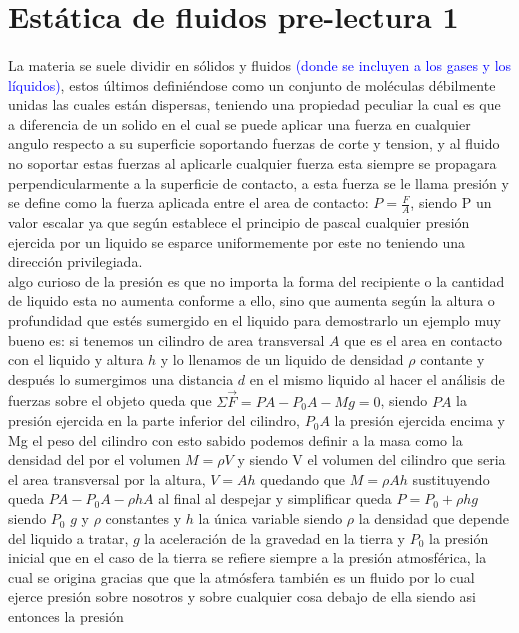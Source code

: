 \documentclass{article}
\begin{document}
\section*{Estática de fluidos pre-lectura 1}
\paragraph*{}
La materia se suele dividir en sólidos y fluidos \textcolor{blue}{(donde se incluyen a los gases y los líquidos)},
estos últimos definiéndose como un conjunto de moléculas débilmente unidas las cuales están dispersas, teniendo una propiedad peculiar la cual es que a diferencia
de un solido en el cual se puede aplicar una fuerza en cualquier angulo respecto a su superficie soportando fuerzas de corte y tension, y al fluido no soportar estas fuerzas 
al aplicarle cualquier fuerza esta siempre se propagara perpendicularmente a la superficie de contacto, a esta fuerza
se le llama presión y se define como la fuerza aplicada entre el area de contacto: $P =\frac{F}{A}$, siendo P un valor
escalar ya que según establece el principio de pascal cualquier presión ejercida por un liquido se esparce uniformemente por este no teniendo una dirección privilegiada.\\
algo curioso de la presión es que no importa la forma del recipiente o la cantidad de liquido esta no aumenta conforme a ello,
sino que aumenta según la altura o profundidad que estés sumergido en el liquido
para demostrarlo  un ejemplo muy bueno es:
si tenemos un cilindro de area transversal $A$ que es el area en contacto con el liquido y altura $h$ y lo llenamos de un liquido de densidad $\rho$ contante
y después lo sumergimos una distancia $d$ en el mismo liquido al hacer el análisis de fuerzas sobre el objeto queda que
$\Sigma \vec{F}=PA-{P}_{0}A-Mg=0$, siendo $PA$ la presión ejercida en la parte inferior del cilindro, ${P}_{0}A$ la presión ejercida encima y Mg el peso del cilindro
con esto sabido podemos definir a la masa como la densidad del por el volumen $M=\rho V$
y siendo V el volumen del cilindro que seria el area transversal por la altura, $V=Ah$
quedando que $M=\rho Ah$ sustituyendo queda $PA-{P}_{0}A-\rho hA$ al final al despejar y simplificar queda
$P={P}_{0}+\rho hg$ siendo ${P}_{0}$ $g$ y $\rho$ constantes y $h$ la única variable
siendo $\rho$ la densidad que depende del liquido a tratar, $g$ la aceleración de la gravedad en la tierra y
${P}_{0}$ la presión inicial que en el caso de la tierra se refiere siempre a la presión atmosférica, la cual se origina
gracias que que la atmósfera también es un fluido por lo cual ejerce presión sobre nosotros y sobre cualquier cosa debajo de ella siendo asi entonces la presión
\end{document}
